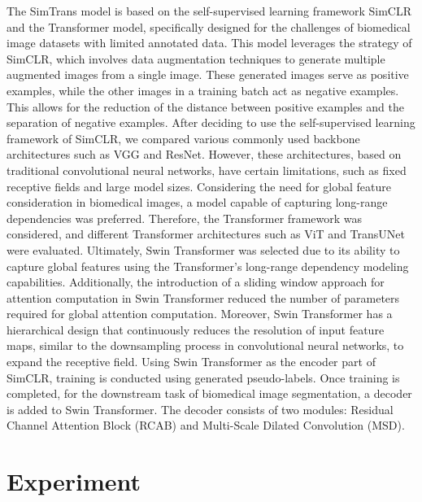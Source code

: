 \documentclass[10pt,twocolumn,letterpaper]{article}
\begin{document}
The SimTrans model is based on the self-supervised learning framework SimCLR and the Transformer model, specifically designed for the challenges of biomedical image datasets with limited annotated data. This model leverages the strategy of SimCLR, which involves data augmentation techniques to generate multiple augmented images from a single image. These generated images serve as positive examples, while the other images in a training batch act as negative examples. This allows for the reduction of the distance between positive examples and the separation of negative examples.
After deciding to use the self-supervised learning framework of SimCLR, we compared various commonly used backbone architectures such as VGG and ResNet. However, these architectures, based on traditional convolutional neural networks, have certain limitations, such as fixed receptive fields and large model sizes. Considering the need for global feature consideration in biomedical images, a model capable of capturing long-range dependencies was preferred. Therefore, the Transformer framework was considered, and different Transformer architectures such as ViT and TransUNet were evaluated. Ultimately, Swin Transformer was selected due to its ability to capture global features using the Transformer's long-range dependency modeling capabilities. Additionally, the introduction of a sliding window approach for attention computation in Swin Transformer reduced the number of parameters required for global attention computation. Moreover, Swin Transformer has a hierarchical design that continuously reduces the resolution of input feature maps, similar to the downsampling process in convolutional neural networks, to expand the receptive field.
Using Swin Transformer as the encoder part of SimCLR, training is conducted using generated pseudo-labels. Once training is completed, for the downstream task of biomedical image segmentation, a decoder is added to Swin Transformer. The decoder consists of two modules: Residual Channel Attention Block (RCAB) and Multi-Scale Dilated Convolution (MSD).


\section{Experiment}
\label{sec:experiment}
\end{document}
